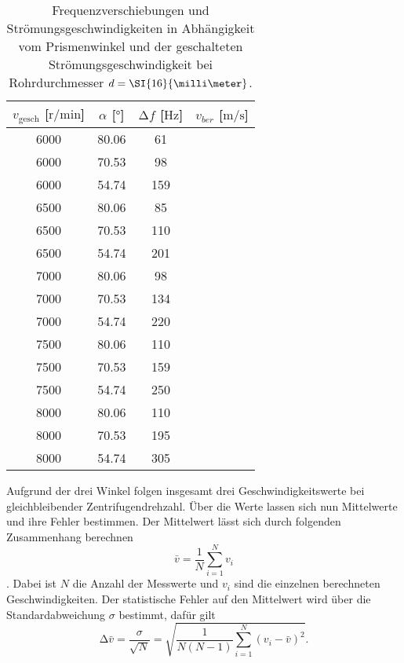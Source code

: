 \begin{table}
    \centering
    \caption{Frequenzverschiebungen und Strömungsgeschwindigkeiten in Abhängigkeit vom Prismenwinkel und der geschalteten Strömungsgeschwindigkeit bei Rohrdurchmesser $\protect d = \SI{16}{\milli\meter}$.}
    \label{tab:6}
    \begin{tabular}{c c c c}
        \toprule
        $v_{\text{gesch}}$ [$\si{{\text{r}}\per\minute}$]  & $\alpha$ [$\si{\degree}$]  & $\increment f$ [$\si{\hertz}$] & $v_{ber}$ [$\si{\meter\per\second}$]\\
        \midrule
        6000    &   80.06    & 61   & ~ \\ 
        6000    &   70.53    & 98   & ~ \\ 
        6000    &   54.74    & 159   & ~ \\ 
        \midrule
        6500    &   80.06   & 85    & ~ \\ 
        6500    &   70.53   & 110    & ~ \\ 
        6500    &   54.74   & 201    & ~ \\ 
        \midrule
        7000    &   80.06   & 98    & ~ \\ 
        7000    &   70.53   & 134    & ~ \\ 
        7000    &   54.74   & 220    & ~ \\ 
        \midrule
        7500    &   80.06   & 110    & ~ \\ 
        7500    &   70.53   & 159    & ~ \\ 
        7500    &   54.74   & 250   & ~ \\ 
        \midrule
        8000    &   80.06   & 110    & ~ \\ 
        8000    &   70.53   & 195    & ~ \\ 
        8000    &   54.74   & 305   & ~ \\ 
        \bottomrule
    \end{tabular}
\end{table}   
                            
Aufgrund der drei Winkel folgen insgesamt drei Geschwindigkeitswerte bei gleichbleibender Zentrifugendrehzahl. Über die Werte lassen sich nun Mittelwerte und ihre Fehler bestimmen.
Der Mittelwert lässt sich durch folgenden Zusammenhang berechnen
\begin{equation}
    \label{eqn:mittel}
\bar{v} = \frac{1}{N} \sum_{i=1}^{N} v_{i}
\end{equation}.
Dabei ist $N$ die Anzahl der Messwerte und $v_{i}$ sind die einzelnen berechneten Geschwindigkeiten.
Der statistische Fehler auf den Mittelwert wird über die Standardabweichung $\sigma$ bestimmt, dafür gilt
\begin{equation}
    \label{eqn:sem}
\increment \bar{v} = \frac{\sigma}{\sqrt{N}} = \sqrt{\frac{1}{N(N-1)} \sum_{i=1}^{N} (v_{i} - \bar{v})^{2}}.
\end{equation}            
                           
                        